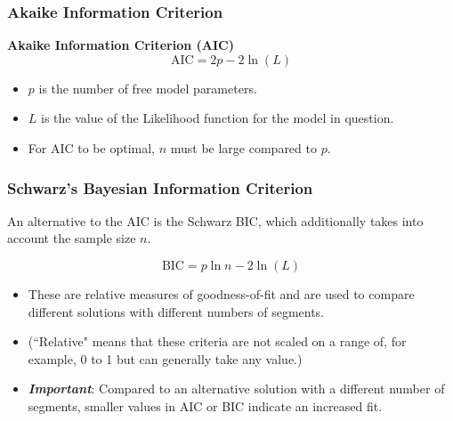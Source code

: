 \documentclass[PredictiveAnalytics101.tex]{subfiles}
\begin{document}
	\begin{frame}
	\frametitle{Akaike Information Criterion}
	\Large
	\textbf{Akaike Information Criterion (AIC)}
%		
		\Huge
		\[\mbox{AIC} = 2p - 2\ln(L)\]
		
			\Large
			\begin{itemize}
				\item $p$ is the number of free model parameters.
				\item $L$ is the value of the Likelihood function for the model in question.
				\item For AIC to be optimal, $n$ must be large compared to $p$.\\
			\end{itemize}
	\end{frame}


\begin{frame}
\frametitle{Schwarz's Bayesian Information Criterion}
An alternative to the AIC is the Schwarz BIC, which additionally takes into account the sample size $n$.

\[\mbox{BIC} = p\ln{n} - 2\ln(L)\]
\end{frame}
%
%
%
\begin{frame}
\Large
\begin{itemize}
\item 
These are relative measures of goodness-of-fit and are used to compare different
solutions with different numbers of segments.
\item (``Relative" means that these criteria
are not scaled on a range of, for example, 0 to 1 but can generally take any value.)

\item 
\textbf{\textit{Important}}: Compared to an alternative solution with a different number of segments, smaller
values in AIC or BIC indicate an increased fit.
\end{itemize}
\end{frame}
\end{document}
